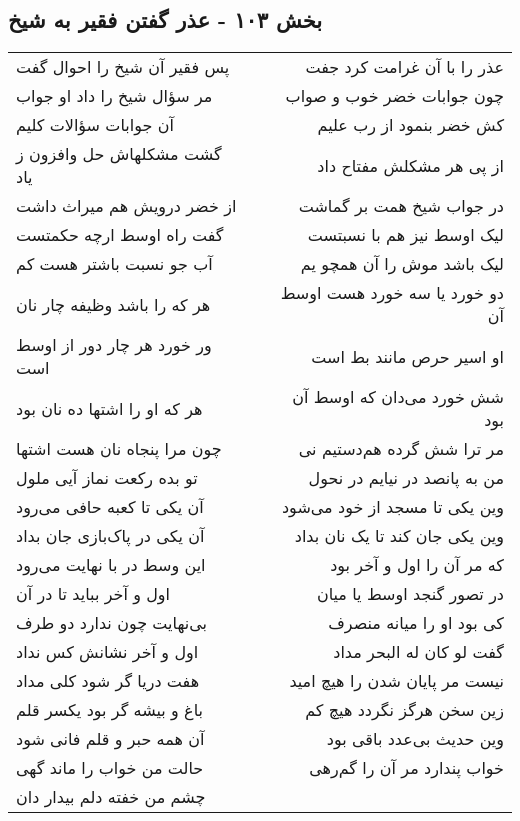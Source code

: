 \begin{center}
\section*{بخش ۱۰۳ - عذر گفتن فقیر به شیخ}
\label{sec:sh103}
\begin{longtable}{l p{0.5cm} r}
پس فقیر آن شیخ را احوال گفت
&&
عذر را با آن غرامت کرد جفت
\\
مر سؤال شیخ را داد او جواب
&&
چون جوابات خضر خوب و صواب
\\
آن جوابات سؤالات کلیم
&&
کش خضر بنمود از رب علیم
\\
گشت مشکلهاش حل وافزون ز یاد
&&
از پی هر مشکلش مفتاح داد
\\
از خضر درویش هم میراث داشت
&&
در جواب شیخ همت بر گماشت
\\
گفت راه اوسط ارچه حکمتست
&&
لیک اوسط نیز هم با نسبتست
\\
آب جو نسبت باشتر هست کم
&&
لیک باشد موش را آن همچو یم
\\
هر که را باشد وظیفه چار نان
&&
دو خورد یا سه خورد هست اوسط آن
\\
ور خورد هر چار دور از اوسط است
&&
او اسیر حرص مانند بط است
\\
هر که او را اشتها ده نان بود
&&
شش خورد می‌دان که اوسط آن بود
\\
چون مرا پنجاه نان هست اشتها
&&
مر ترا شش گرده هم‌دستیم نی
\\
تو بده رکعت نماز آیی ملول
&&
من به پانصد در نیایم در نحول
\\
آن یکی تا کعبه حافی می‌رود
&&
وین یکی تا مسجد از خود می‌شود
\\
آن یکی در پاک‌بازی جان بداد
&&
وین یکی جان کند تا یک نان بداد
\\
این وسط در با نهایت می‌رود
&&
که مر آن را اول و آخر بود
\\
اول و آخر بباید تا در آن
&&
در تصور گنجد اوسط یا میان
\\
بی‌نهایت چون ندارد دو طرف
&&
کی بود او را میانه منصرف
\\
اول و آخر نشانش کس نداد
&&
گفت لو کان له البحر مداد
\\
هفت دریا گر شود کلی مداد
&&
نیست مر پایان شدن را هیچ امید
\\
باغ و بیشه گر بود یکسر قلم
&&
زین سخن هرگز نگردد هیچ کم
\\
آن همه حبر و قلم فانی شود
&&
وین حدیث بی‌عدد باقی بود
\\
حالت من خواب را ماند گهی
&&
خواب پندارد مر آن را گم‌رهی
\\
چشم من خفته دلم بیدار دان

\end{longtable}
\end{center}
